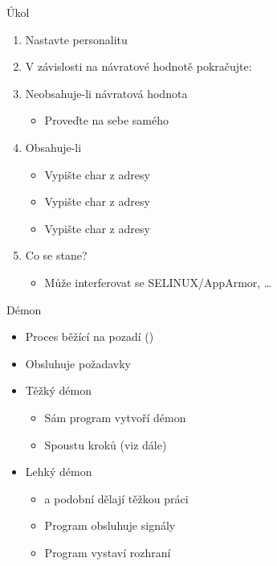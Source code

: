 \begin{frame}{Úkol}

  \begin{enumerate}
    \item Nastavte personalitu 
    \item V závislosti na návratové hodnotě pokračujte:
    \item Neobsahuje-li návratová hodnota 
    \begin{itemize}
      \item Proveďte  na sebe samého
    \end{itemize}

    \item Obsahuje-li 
    \begin{itemize}
      \item Vypište char z adresy 
      \item Vypište char z adresy 
      \item Vypište char z adresy 
    \end{itemize}

    \item Co se stane?
    \begin{itemize}
      \item Může interferovat se SELINUX/AppArmor, \dots
    \end{itemize}
  \end{enumerate}

\end{frame}





\begin{frame}{Démon}

  \begin{itemize}
    \item Proces běžící na pozadí ()
    \item Obsluhuje požadavky

    \pause

    \item Těžký démon
    \begin{itemize}
      \item Sám program vytvoří démon
      \item Spoustu kroků (viz dále)
    \end{itemize}

    \pause

    \item Lehký démon
    \begin{itemize}
      \item {} a podobní dělají těžkou práci
      \item Program obsluhuje signály
      \item Program vystaví rozhraní
    \end{itemize}
  \end{itemize}

\end{frame}

